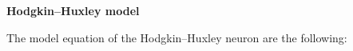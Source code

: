 \documentclass{report}
\begin{document}
	\begin{center}
		\textbf{\huge Hodgkin–Huxley model}
	\end{center}
	The model equation of the Hodgkin–Huxley neuron are the following:
	
\end{document}
